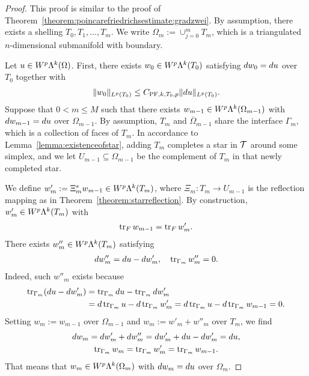 \documentclass[10pt,letterpaper]{article}
\begin{document}
\begin{proof}
    This proof is similar to the proof of Theorem~\ref{theorem:poincarefriedrichsestimate:gradzwei}.
    By assumption, there exists a shelling $T_0, T_1, \dots, T_m$. 
    We write $\Omega_m := \cup_{j=0}^{m} T_m$, which is a triangulated $n$-dimensional submanifold with boundary.

    Let $u \in W^{p}\Lambda^{k}(\Omega)$. 
    First, there exists $w_0 \in W^{p}\Lambda^{k}(T_{0})$ satisfying $d w_0 = d u$ over $T_{0}$ together with 
    \begin{gather*}
        \| w_0 \|_{L^{p}(T_{0})} \leq C_{{\rm{PF}},k,T_{0},p} \| d u \|_{L^{p}(T_{0})}.
    \end{gather*}
    Suppose that $0 < m \leq M$ such that there exists $w_{m-1} \in W^{p}\Lambda^{k}(\Omega_{m-1})$ 
    with $d w_{m-1} = d u$ over $\Omega_{m-1}$. 
    By assumption, $T_{m}$ and $\overline\Omega_{m-1}$ share the interface $\Gamma_{m}$, which is a collection of faces of $T_{m}$. 
    In accordance to Lemma~\ref{lemma:existenceofstar}, adding $T_{m}$ completes a star in ${\mathcal T}$ around some simplex, and we let $U_{m-1} \subseteq \Omega_{m-1}$ be the complement of $T_{m}$ in that newly completed star. 
    
    We define $w'_{m} :=  \Xi_{m}^{\ast} w_{m-1} \in W^{p}\Lambda^{k}(T_{m})$,
    where $\Xi_{m} : T_{m} \rightarrow U_{m-1}$ is the reflection mapping
    as in Theorem~\ref{theorem:starreflection}. 
    By construction, $w'_{m} \in W^{p}\Lambda^{k}(T_{m})$ with 
    \begin{align*}
        \operatorname{tr}_F w_{m-1} = \operatorname{tr}_F w'_{m}
        . 
    \end{align*}
    There exists $w''_{m} \in W^{p}\Lambda^{k}(T_{m})$ satisfying 
    \begin{align*}
        d w''_{m} = d u - d w'_{m}, 
        \quad 
        \operatorname{tr}_{\Gamma_{m}} w''_{m} = 0.
    \end{align*}
    Indeed, such $w''_{m}$ exists because 
    \begin{align*}
        \operatorname{tr}_{\Gamma_{m}}( d u - d w'_{m} ) 
        &= 
        \operatorname{tr}_{\Gamma_{m}} d u - \operatorname{tr}_{\Gamma_{m}} d w'_{m}
        \\&= 
        d \operatorname{tr}_{\Gamma_{m}} u - d \operatorname{tr}_{\Gamma_{m}} w'_{m}
        = 
        d \operatorname{tr}_{\Gamma_{m}} u - d \operatorname{tr}_{\Gamma_{m}} w_{m-1}
        = 
        0
        .
    \end{align*}
    Setting $w_{m} := w_{m-1}$ over $\Omega_{m-1}$ and $w_{m} := w'_{m} + w''_{m}$ over $T_{m}$, 
    we find 
    \begin{gather*}
        d w_{m} = d w'_{m} + d w''_{m} = d w'_{m} + d u - d w'_{m} = d u,
        \\
        \operatorname{tr}_{\Gamma_{m}} w_{m} = \operatorname{tr}_{\Gamma_{m}} w'_{m} = \operatorname{tr}_{\Gamma_{m}} w_{m-1}.
    \end{gather*}
    That means that $w_{m} \in W^{p}\Lambda^{k}(\Omega_{m})$ with $d w_{m} = d u$ over $\Omega_{m}$. 
    

\end{proof}
\end{document}
